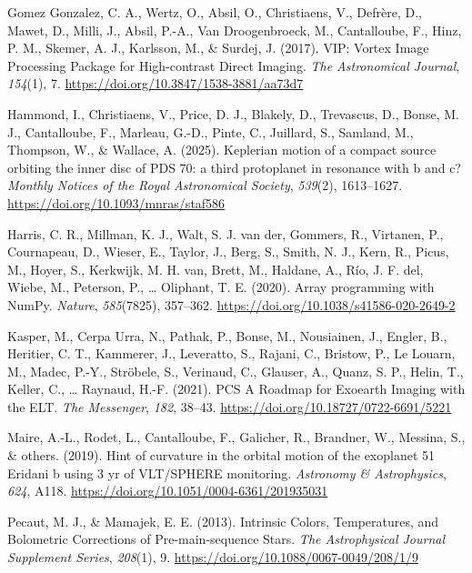 \documentclass[
]{article}
\newlength{\cslhangindent}
\newenvironment{CSLReferences}[2] %
 {\begin{list}{}{%
  \setlength{\itemindent}{0pt}
  \setlength{\leftmargin}{0pt}
  \setlength{\parsep}{0pt}
  \ifodd #1
   \setlength{\leftmargin}{\cslhangindent}
   \setlength{\itemindent}{-1\cslhangindent}
  \fi
  \setlength{\itemsep}{#2\baselineskip}}}
 {\end{list}}
\begin{document}
\begin{CSLReferences}{1}{0}
Gomez Gonzalez, C. A., Wertz, O., Absil, O., Christiaens, V., Defrère,
D., Mawet, D., Milli, J., Absil, P.-A., Van Droogenbroeck, M.,
Cantalloube, F., Hinz, P. M., Skemer, A. J., Karlsson, M., \& Surdej, J.
(2017). {VIP: Vortex Image Processing Package for High-contrast Direct
Imaging}. \emph{The Astronomical Journal}, \emph{154}(1), 7.
\url{https://doi.org/10.3847/1538-3881/aa73d7}

Hammond, I., Christiaens, V., Price, D. J., Blakely, D., Trevascus, D.,
Bonse, M. J., Cantalloube, F., Marleau, G.-D., Pinte, C., Juillard, S.,
Samland, M., Thompson, W., \& Wallace, A. (2025). {Keplerian motion of a
compact source orbiting the inner disc of PDS 70: a third protoplanet in
resonance with b and c?} \emph{Monthly Notices of the Royal Astronomical
Society}, \emph{539}(2), 1613--1627.
\url{https://doi.org/10.1093/mnras/staf586}

Harris, C. R., Millman, K. J., Walt, S. J. van der, Gommers, R.,
Virtanen, P., Cournapeau, D., Wieser, E., Taylor, J., Berg, S., Smith,
N. J., Kern, R., Picus, M., Hoyer, S., Kerkwijk, M. H. van, Brett, M.,
Haldane, A., Río, J. F. del, Wiebe, M., Peterson, P., \ldots{} Oliphant,
T. E. (2020). Array programming with {NumPy}. \emph{Nature},
\emph{585}(7825), 357--362.
\url{https://doi.org/10.1038/s41586-020-2649-2}

Kasper, M., Cerpa Urra, N., Pathak, P., Bonse, M., Nousiainen, J.,
Engler, B., Heritier, C. T., Kammerer, J., Leveratto, S., Rajani, C.,
Bristow, P., Le Louarn, M., Madec, P.-Y., Ströbele, S., Verinaud, C.,
Glauser, A., Quanz, S. P., Helin, T., Keller, C., \ldots{} Raynaud,
H.-F. (2021). {PCS {\textemdash} A Roadmap for Exoearth Imaging with the
ELT}. \emph{The Messenger}, \emph{182}, 38--43.
\url{https://doi.org/10.18727/0722-6691/5221}

Maire, A.-L., Rodet, L., Cantalloube, F., Galicher, R., Brandner, W.,
Messina, S., \& others. (2019). {Hint of curvature in the orbital motion
of the exoplanet 51 Eridani b using 3 yr of VLT/SPHERE monitoring}.
\emph{Astronomy \& Astrophysics}, \emph{624}, A118.
\url{https://doi.org/10.1051/0004-6361/201935031}

Pecaut, M. J., \& Mamajek, E. E. (2013). {Intrinsic Colors,
Temperatures, and Bolometric Corrections of Pre-main-sequence Stars}.
\emph{The Astrophysical Journal Supplement Series}, \emph{208}(1), 9.
\url{https://doi.org/10.1088/0067-0049/208/1/9}


\end{CSLReferences}
\end{document}
